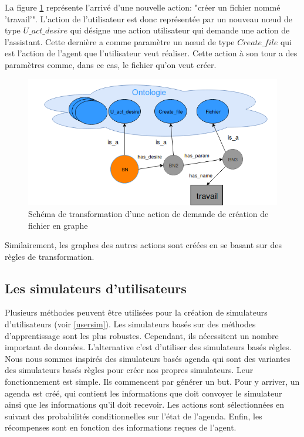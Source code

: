 La figure \ref{nonabstract_onto} représente l'arrivé d'une nouvelle action: "créer un fichier nommé 'travail'". L'action de l'utilisateur est donc représentée par un nouveau n\oe{}ud de type $U\_act\_desire$ qui désigne une action utilisateur qui demande une action de l'assistant. Cette dernière a comme paramètre un n\oe{}ud de type $Create\_file$ qui est l'action de l'agent que l'utilisateur veut réaliser. Cette action à son tour a des paramètres comme, dans ce cas, le fichier qu'on veut créer.
\begin{figure}[H] 
	\centering
	\includegraphics[width=0.88\linewidth]{images/Conception/DM/nonabstract_onto.png}
	\caption{Schéma de transformation d'une action de demande de création de fichier en graphe}\label{nonabstract_onto}
	
\end{figure}
Similairement, les graphes des autres actions sont créées en se basant sur des règles de transformation.
\subsection{Les simulateurs d'utilisateurs}
Plusieurs méthodes peuvent être utilisées pour la création de simulateurs d'utilisateurs (voir \ref{usersim}). Les simulateurs basés sur des méthodes d'apprentissage sont les plus robustes. Cependant, ils nécessitent un nombre important de données. L'alternative c'est d'utiliser des simulateurs basés règles. Nous nous sommes inspirés des simulateurs basés agenda \citep{Schatzmann2007} qui sont des variantes des simulateurs basés règles pour créer nos propres simulateurs. Leur fonctionnement est simple. Ils commencent par générer un but. Pour y arriver, un agenda est créé, qui contient les informations que doit convoyer le simulateur ainsi que les informations qu'il doit recevoir. Les actions sont sélectionnées en suivant des probabilités conditionnelles sur l'état de l'agenda. Enfin, les récompenses sont en fonction des informations reçues de l'agent.
